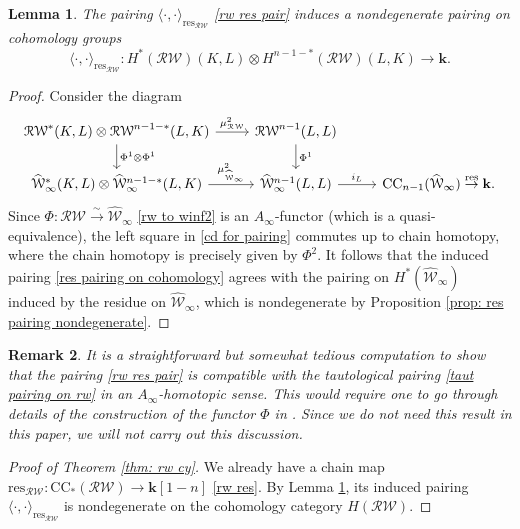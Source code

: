 \documentclass[11pt]{amsproc}
\def\K{{\mathbf{k}}}
\def\w{\mathcal{W}(E)}
\def\r#1{\mathrm{#1}}
\def\w{\mathcal{W}}
\def\rw{\mathcal{RW}}
\def\ainf{A_\infty}
\def\winf{\widehat{\w}_{\infty}}
\newtheorem{lem}{Lemma}[section]
\newtheorem{rem}[lem]{Remark}
\theoremstyle{remark}
\numberwithin{equation}{section}
\begin{document}
\begin{lem}\label{lem: res pairing is taut pairing}
The pairing $\langle \cdot, \cdot \rangle_{\r{res}_{\rw}}$ \eqref{rw res pair} induces a nondegenerate pairing on cohomology groups
\begin{equation}\label{res pairing on cohomology}
\langle \cdot, \cdot \rangle_{\r{res}_{\rw}}: H^{*}(\rw)(K, L) \otimes H^{n-1-*}(\rw)(L, K) \to \K.
\end{equation}
\end{lem}
\begin{proof}
Consider the diagram
\begin{equation}\label{cd for pairing}
\begin{tikzcd}
\rw^{*}(K, L) \otimes \rw^{n-1-*}(L, K) \arrow["\mu^{2}_{\rw}", r] \arrow["\Phi^{1} \otimes \Phi^{1}", d] & \rw^{n-1}(L, L) \arrow["\Phi^{1}", d] \\
\winf^{*}(K, L) \otimes \winf^{n-1-*}(L, K) \arrow["\mu^{2}_{\winf}", r] & \winf^{n-1}(L, L) \arrow["i_{L}", r] &\r{CC}_{n-1}(\winf) \stackrel{\r{res}}\to \K.
\end{tikzcd}
\end{equation}
Since $\Phi: \rw \stackrel{\sim}\to \winf$ \eqref{rw to winf2} is an $\ainf$-functor (which is a quasi-equivalence), 
the left square in \eqref{cd for pairing} commutes up to chain homotopy, 
where the chain homotopy is precisely given by $\Phi^{2}$.
It follows that the induced pairing \eqref{res pairing on cohomology} agrees with the pairing on $H^{*}(\winf)$ induced by the residue on $\winf$, 
which is nondegenerate by Proposition \ref{prop: res pairing nondegenerate}.
\end{proof}

\begin{rem}
It is a straightforward but somewhat tedious computation to show that the pairing \eqref{rw res pair} is compatible with the tautological pairing \eqref{taut pairing on rw} in an $\ainf$-homotopic sense.
This would require one to go through details of the construction of the functor $\Phi$ in \cite{GGV}. 
Since we do not need this result in this paper, we will not carry out this discussion.
\end{rem}

\begin{proof}[Proof of Theorem \ref{thm: rw cy}]
We already have a chain map $\r{res}_{\rw}: \r{CC}_{*}(\rw) \to \K[1-n]$ \eqref{rw res}.
By Lemma \ref{lem: res pairing is taut pairing}, its induced pairing $\langle \cdot, \cdot \rangle_{\r{res}_{\rw}}$ is nondegenerate on the cohomology category $H(\rw)$.
\end{proof}
\end{document}
